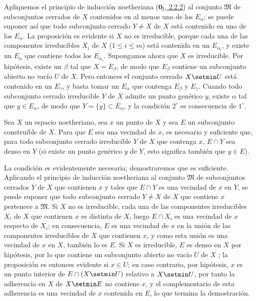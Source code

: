 Apliquemos el principio de inducción noetheriana
(\hyperref[0.2.2.2-fr]{$\mathbf{0}_{\mathrm I}$, 2.2.2}) al conjunto
$\mathfrak{M}$ de subconjuntos cerrados de $X$ contenidos en al menos uno de los $E_\alpha$; se puede suponer así que todo subconjunto cerrado $Y\ne X$ de $X$ está contenido en uno de los $E_\alpha$.
La proposición es evidente si $X$ no es irreducible, porque cada una de las componentes irreducibles $X_i$ de $X$ ($1\leq i\leq m$) está contenida en un $E_{\alpha_i}$, y existe un $E_\alpha$ que contiene todos los $E_{\alpha_i}$.
Supongamos ahora que $X$ es irreducible.
Por hipótesis, existe un $\beta$ tal que $X=\overline{E}_\beta$, de modo que  $E_\beta$ contiene un subconjunto abierto no vacío $U$ de $X$.
Pero entonces el conjunto cerrado $X\setmin U$ está contenido en un $E_\gamma$, y basta tomar un $E_\alpha$ que contenga $E_\beta$ y $E_\gamma$.
Cuando todo subconjunto cerrado irreducible $Y$ de $X$
admite un punto genérico $y$, existe $\alpha$ tal que $y\in E_\alpha$, de modo que $Y=\overline{\{y\}}\subset\overline{E}_\alpha$, y la condición $2^\circ$ es consecuencia de $1^\circ$.

\begin{proposition}[9.2.5]
\label{0.9.2.5}
\label{0.9.2.5-fr}
Sea $X$ un espacio noetheriano, sea $x$ un punto de $X$ y sea $E$ un subconjunto construible de $X$.
Para que $E$ sea una vecindad de $x$, es necesario y suficiente que, para todo subconjunto cerrado irreducible $Y$ de $X$ que contenga $x$, $E\cap Y$ sea denso en $Y$ (si existe un punto genérico $y$ de $Y$, esto significa también \textup{} que $y\in E$).
\end{proposition}


La condición es evidentemente necesaria; demostraremos que es suficiente.
Aplicando el principio de inducción noetheriana al conjunto $\mathfrak{M}$ de subconjuntos cerrados $Y$ de $X$ que contienen $x$ y tales que $E\cap Y$ es una vecindad de $x$ en $Y$, se puede suponer que todo subconjunto cerrado $Y\ne X$ de $X$ que contiene $x$ pertenece a $\mathfrak{M}$.
Si $X$ no es irreducible, cada una de las componentes irreducibles $X_i$ de $X$ que contienen $x$ es distinta de $X$, luego $E\cap X_i$ es una vecindad de $x$ respecto de $X_i$; en consecuencia, $E$ es una vecindad de $x$ en la unión de las componentes irreducibles de $X$ que contienen $x$, y como esta unión es una vecindad de $x$ en $X$, también lo es $E$.
Si $X$ es irreducible, $E$ es denso en $X$ por hipótesis, por lo que contiene un subconjunto abierto no vacío $U$ de $X$ ; la proposición es entonces evidente si $x\in U$; en caso contrario, por hipótesis, $x$ es un punto interior de $E\cap(X\setmin U)$ relativo a $X\setmin U$, por tanto la adherencia en
$X$ de $X\setmin E$ no contiene $x$, y el complementario de esta adherencia es una vecindad de $x$ contenida en $E$, lo que termina la demostración.


